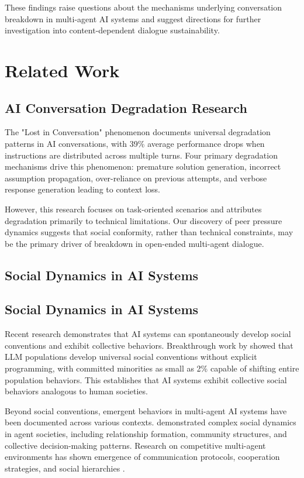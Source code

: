 \documentclass[11pt,letterpaper]{article}
\begin{document}
These findings raise questions about the mechanisms underlying conversation breakdown in multi-agent AI systems and suggest directions for further investigation into content-dependent dialogue sustainability.

\section{Related Work}

\subsection{AI Conversation Degradation Research}

The "Lost in Conversation" phenomenon \citep{laban2025lost} documents universal degradation patterns in AI conversations, with 39\% average performance drops when instructions are distributed across multiple turns. Four primary degradation mechanisms drive this phenomenon: premature solution generation, incorrect assumption propagation, over-reliance on previous attempts, and verbose response generation leading to context loss.

However, this research focuses on task-oriented scenarios and attributes degradation primarily to technical limitations. Our discovery of peer pressure dynamics suggests that social conformity, rather than technical constraints, may be the primary driver of breakdown in open-ended multi-agent dialogue.

\subsection{Social Dynamics in AI Systems}

\subsection{Social Dynamics in AI Systems}

Recent research demonstrates that AI systems can spontaneously develop social conventions and exhibit collective behaviors. Breakthrough work by \citet{jackson2024ai} showed that LLM populations develop universal social conventions without explicit programming, with committed minorities as small as 2\% capable of shifting entire population behaviors. This establishes that AI systems exhibit collective social behaviors analogous to human societies.

Beyond social conventions, emergent behaviors in multi-agent AI systems have been documented across various contexts. \citet{park2023generative} demonstrated complex social dynamics in agent societies, including relationship formation, community structures, and collective decision-making patterns. Research on competitive multi-agent environments has shown emergence of communication protocols, cooperation strategies, and social hierarchies \citep{eccles2019biases,foerster2018emergent}.
\end{document}
